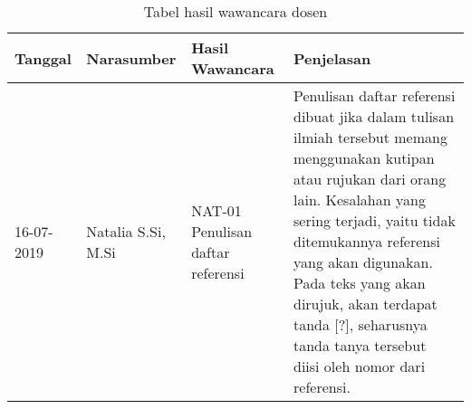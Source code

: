 \begin{table}[H]
	\caption {Tabel hasil wawancara dosen} \label{tab:hasil_wawancara3}
	\begin{center}
		\begin{tabular}{|p{2 cm}|>{\raggedright} p{3.5 cm}| p{4 cm}| p{5 cm}|}
		\hline
		Tanggal & Narasumber & Hasil Wawancara & Penjelasan \\ 
		\hline
		16-07-2019 & Natalia S.Si, M.Si & NAT-01 \newline Penulisan daftar referensi & Penulisan daftar referensi dibuat jika dalam tulisan ilmiah tersebut memang menggunakan kutipan atau rujukan dari orang lain. Kesalahan yang sering terjadi, yaitu tidak ditemukannya referensi yang akan digunakan. Pada teks yang akan dirujuk, akan terdapat tanda [?], seharusnya tanda tanya tersebut diisi oleh nomor dari referensi. \newline \\ 
		\hline
		\end{tabular}
	\end{center}
\end{table}

